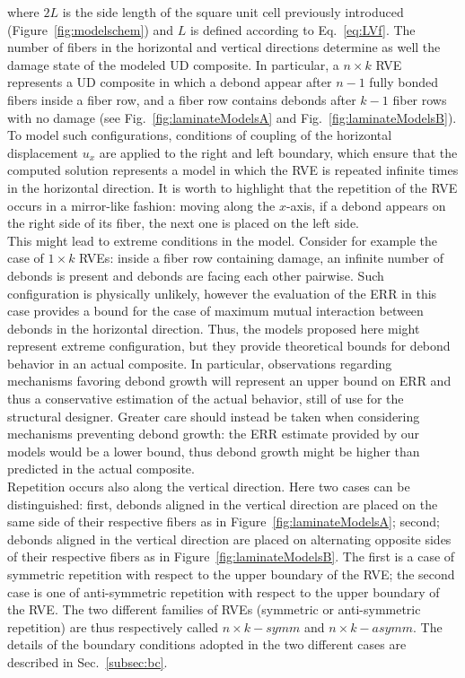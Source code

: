 \documentclass[smallextended]{svjour3}       %
\begin{document}
where $2L$ is the side length of the square unit cell previously introduced (Figure~\ref{fig:modelschem}) and $L$ is defined according to Eq.~\ref{eq:LVf}. The number of fibers in the horizontal and vertical directions determine as well the damage state of the modeled UD composite. In particular, a $n\times k$ RVE represents a UD composite in which a debond appear after $n-1$ fully bonded fibers inside a fiber row, and a fiber row contains debonds after $k-1$ fiber rows with no damage (see Fig.~\ref{fig:laminateModelsA} and Fig.~\ref{fig:laminateModelsB}). To model such configurations, conditions of coupling of the horizontal displacement $u_{x}$ are applied to the right and left boundary, which ensure that the computed solution represents a model in which the RVE is repeated infinite times in the horizontal direction. It is worth to highlight that the repetition of the RVE occurs in a mirror-like fashion: moving along the $x$-axis, if a debond appears on the right side of its fiber, the next one is placed on the left side.\\
This might lead to extreme conditions in the model. Consider for example the case of $1\times k$ RVEs: inside a fiber row containing damage, an infinite number of debonds is present and debonds are facing each other pairwise. Such configuration is physically unlikely, however the evaluation of the ERR in this case provides a bound for the case of maximum mutual interaction between debonds in the horizontal direction. Thus, the models proposed here might represent extreme configuration, but they provide theoretical bounds for debond behavior in an actual composite. In particular, observations regarding mechanisms favoring debond growth will represent an upper bound on ERR and thus a conservative estimation of the actual behavior, still of use for the structural designer. Greater care should instead be taken when considering mechanisms preventing debond growth: the ERR estimate provided by our models would be a lower bound, thus debond growth might be higher than predicted in the actual composite.\\
Repetition occurs also along the vertical direction. Here two cases can be distinguished: first, debonds aligned in the vertical direction are placed on the same side of their respective fibers as in Figure~\ref{fig:laminateModelsA}; second; debonds aligned in the vertical direction are placed on alternating opposite sides of their respective fibers as in Figure~\ref{fig:laminateModelsB}. The first is a case of symmetric repetition with respect to the upper boundary of the RVE; the second case is one of anti-symmetric repetition with respect to the upper boundary of the RVE. The two different families of RVEs (symmetric or anti-symmetric repetition) are thus respectively called $n\times k-symm$ and $n\times k-asymm$. The details of the boundary conditions adopted in the two different cases are described in Sec.~\ref{subsec:bc}.
\end{document}
